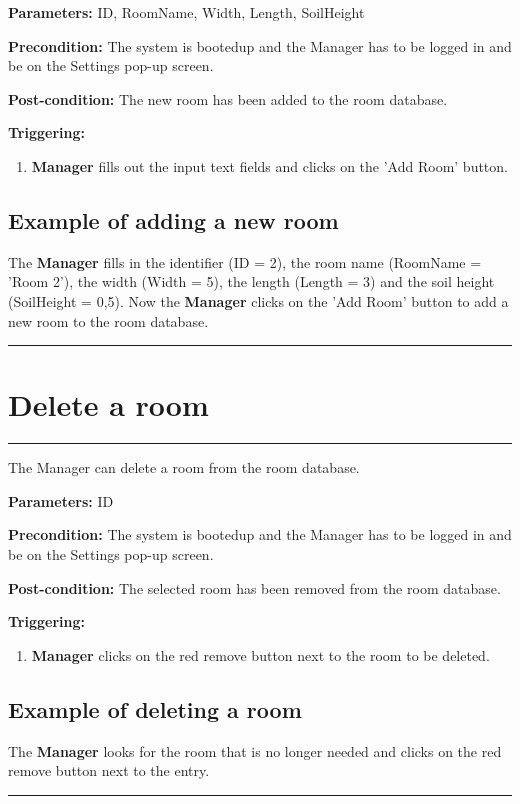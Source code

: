 \begin{description}

\item \textbf{Parameters:} ID, RoomName, Width, Length, SoilHeight
\item \textbf{Precondition:} The system is bootedup and the Manager has to be
logged in and be on the Settings pop-up screen.
\item \textbf{Post-condition:} The new room has been added to the room database.
\item \textbf{Triggering:}
\begin{enumerate}

\item \textbf{Manager} fills out the input text fields and clicks on the 'Add Room' button.

\end{enumerate}
\end{description}

\subsection{Example of adding a new room}
The \textbf{Manager} fills in the identifier (ID = 2), the room name (RoomName = 'Room 2'), the width (Width = 5), the length (Length = 3) and the soil height (SoilHeight = 0,5).
Now the \textbf{Manager} clicks on the 'Add Room' button to add a new room to the room database.
\hfill
\vspace{0.5cm}
\hrule




\section{Delete a room}
\hrule
\hfill
\vspace{0.5cm}
\label{operation:Delete a room}

The Manager can delete a room from the room database.

\begin{description}

\item \textbf{Parameters:} ID
\item \textbf{Precondition:} The system is bootedup and the Manager has to be
logged in and be on the Settings pop-up screen.
\item \textbf{Post-condition:} The selected room has been removed from the room database.
\item \textbf{Triggering:}
\begin{enumerate}

\item \textbf{Manager} clicks on the red remove button next to the room to be deleted.

\end{enumerate}
\end{description}

\subsection{Example of deleting a room}
The \textbf{Manager} looks for the room that is no longer needed and clicks on the red remove button next to the entry.
\hfill
\vspace{0.5cm}
\hrule
